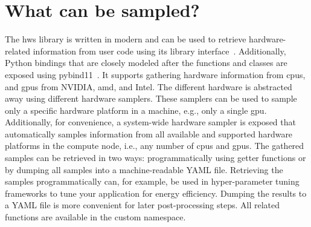 \section{What can be sampled?}
\label{sec:hws_what}

The hws library is written in modern  and can be used to retrieve hardware-related information from user code using its library interface~\cite{breyer_hws_2024}. 
Additionally, Python bindings that are closely modeled after the \cpp functions and classes are exposed using pybind11~\cite{jakob_pybind11_2024}. 
It supports gathering hardware information from \glspl{cpu}, and \glspl{gpu} from NVIDIA, \gls{amd}, and Intel.  
The different hardware is abstracted away using different hardware samplers. 
These samplers can be used to sample only a specific hardware platform in a machine, e.g., only a single \gls{gpu}. 
Additionally, for convenience, a system-wide hardware sampler is exposed that automatically samples information from all available and supported hardware platforms in the compute node, i.e., any number of \glspl{cpu} and \glspl{gpu}. 
The gathered samples can be retrieved in two ways: programmatically using getter functions or by dumping all samples into a machine-readable YAML file. 
Retrieving the samples programmatically can, for example, be used in hyper-parameter tuning frameworks to tune your application for energy efficiency. 
Dumping the results to a YAML file is more convenient for later post-processing steps. 
All related functions are available in the custom  namespace. 

